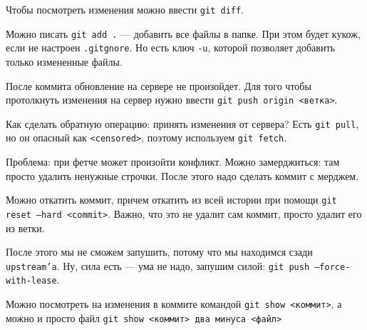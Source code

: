Чтобы посмотреть изменения можно ввести \texttt{git diff}.

Можно писать \texttt{git add .} --- добавить все файлы в папке. При этом будет кукож, если не настроен \texttt{.gitgnore}. Но есть ключ \texttt{-u}, которой позволяет добавить только измененные файлы.

После коммита обновление на сервере не произойдет. Для того чтобы протолкнуть изменения на сервер нужно ввести  \texttt{git push origin <ветка>}. 
 

Как сделать обратную операцию: принять изменения от сервера? Есть \texttt{git pull}, но он опасный как \texttt{<censored>}, поэтому используем \texttt{git fetch}.

Проблема: при фетче может произойти конфликт. Можно замерджиться: там просто удалить ненужные строчки. После этого надо сделать коммит с мерджем. 


Можно откатить коммит, причем откатить из всей истории при помощи \texttt{git reset --hard <commit>}. Важно, что это не удалит сам коммит, просто удалит его из ветки.

После этого мы не сможем запушить, потому что мы находимся сзади \texttt{upstream'а}. Ну, сила есть --- ума не надо, запушим силой: \texttt{git push --force-with-lease}.


Можно посмотреть на изменения в коммите командой \texttt{git show <коммит>}, а можно и просто файл \texttt{git show <коммит> два минуса <файл>}

